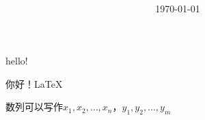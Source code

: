 \documentclass{article}
\title{\heiti \myArticleName\\ [2ex] \begin{large} \myHomeworkNumber \end{large}}
\author{\kaishu \myName \myNumber}
\date{\today}
\newcommand*{\myseries}[2][n]{$#2_1,#2_2,\dots,#2_#1$}
\begin{document}
\maketitle

  hello!

  你好！\LaTeX

  \newpage

  数列可以写作\myseries{x}，\myseries[m]{y}
\end{document}
